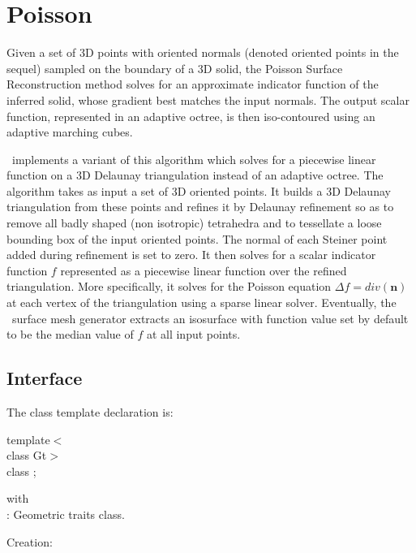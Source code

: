 \section{Poisson}

Given a set of 3D points with oriented normals (denoted oriented points in the sequel) sampled on the boundary of a 3D solid, the Poisson Surface Reconstruction method \cite{Kazhdan06} solves for an approximate indicator function of the inferred solid, whose gradient best matches the input normals. The output scalar function, represented in an adaptive octree, is then iso-contoured using an adaptive marching cubes.

\cgal\ implements a variant of this algorithm which solves for a piecewise linear function on a 3D Delaunay triangulation instead of an adaptive octree. The algorithm takes as input a set of 3D oriented points. It builds a 3D Delaunay triangulation from these points and refines it by Delaunay refinement so as to remove all badly shaped (non isotropic) tetrahedra and to tessellate a loose bounding box of the input oriented points. The normal of each Steiner point added during refinement is set to zero. It then solves for a scalar indicator function $f$ represented as a piecewise linear function over the refined triangulation. More specifically, it solves for the Poisson equation  $\Delta f = div(\mathbf{n})$ at each vertex of the triangulation using a sparse linear solver. Eventually, the \cgal\ surface mesh generator extracts an isosurface with function value set by default to be the median value of $f$ at all input points.

\subsection{Interface}

The class template declaration is:

template$<$  \\
class Gt$>$   \\
class ;

with  \\
: Geometric traits class.

Creation:


